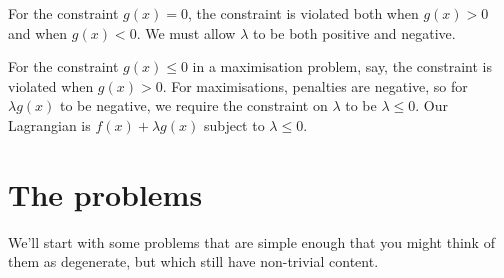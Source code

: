 \documentclass[12pt,reqno]{article}      %
\theoremstyle{definition}
\begin{document}
For the constraint $g(x)=0$, the constraint is violated both when $g(x)>0$ and when $g(x)<0$.
We must allow $\lambda$ to be both positive and negative.

For the constraint $g(x)\le0$ in a maximisation problem, say,
the constraint is violated when $g(x)>0$.
For maximisations, penalties are negative, so for $\lambda g(x)$ to be negative,
we require the constraint on $\lambda$ to be $\lambda\le0$.
Our Lagrangian is $f(x)+\lambda g(x)$ subject to $\lambda\le0$.

\section{The problems}
We'll start with some problems that are simple enough that you might think of them as degenerate, but which still have non-trivial content.
\end{document}
